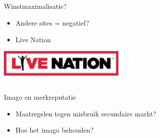 \documentclass{beamer}
\begin{document}
    \subsection{}
    \begin{frame}{Winstmaximalisatie?}
        \begin{itemize}
            \item Andere sites = negatief?
            \item Live Nation
        \end{itemize}
        \begin{center}
            \includegraphics[height=50px, keepaspectratio]{livenation_logo.png}
        \end{center}
    \end{frame}

    \subsection{}
    \begin{frame}{Imago en merkreputatie}
        \begin{itemize}
            \item Maatregelen tegen misbruik secundaire markt?
            \item Hoe het imago behouden?
        \end{itemize}
    \end{frame}


    
\end{document}
